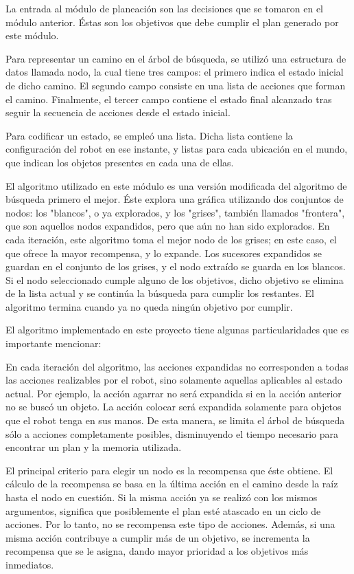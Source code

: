 \documentclass[11pt]{article}
\begin{document}
La entrada al módulo de planeación son las decisiones que se tomaron en el módulo anterior. Éstas son los objetivos que debe cumplir el plan generado por este módulo.

Para representar un camino en el árbol de búsqueda, se utilizó una estructura de datos llamada nodo, la cual tiene tres campos: el primero indica el estado inicial de dicho camino. El segundo campo consiste en una lista de acciones que forman el camino. Finalmente, el tercer campo contiene el estado final alcanzado tras seguir la secuencia de acciones desde el estado inicial.

Para codificar un estado, se empleó una lista. Dicha lista contiene la configuración del robot en ese instante, y listas para cada ubicación en el mundo, que indican los objetos presentes en cada una de ellas.

El algoritmo utilizado en este módulo es una versión modificada del algoritmo de búsqueda primero el mejor. Éste explora una gráfica utilizando dos conjuntos de nodos: los "blancos", o ya explorados, y los "grises", también llamados "frontera", que son aquellos nodos expandidos, pero que aún no han sido explorados. En cada iteración, este algoritmo toma el mejor nodo de los grises; en este caso, el que ofrece la mayor recompensa, y lo expande. Los sucesores expandidos se guardan en el conjunto de los grises, y el nodo extraído se guarda en los blancos. Si el nodo seleccionado cumple alguno de los objetivos, dicho objetivo se elimina de la lista actual y se continúa la búsqueda para cumplir los restantes. El algoritmo termina cuando ya no queda ningún objetivo por cumplir.

El algoritmo implementado en este proyecto tiene algunas particularidades que es importante mencionar:

En cada iteración del algoritmo, las acciones expandidas no corresponden a todas las acciones realizables por el robot, sino solamente aquellas aplicables al estado actual. Por ejemplo, la acción agarrar no será expandida si en la acción anterior no se buscó un objeto. La acción colocar será expandida solamente para objetos que el robot tenga en sus manos. De esta manera, se limita el árbol de búsqueda sólo a acciones completamente posibles, disminuyendo el tiempo necesario para encontrar un plan y la memoria utilizada.

El principal criterio para elegir un nodo es la recompensa que éste obtiene. El cálculo de la recompensa se basa en la última acción en el camino desde la raíz hasta el nodo en cuestión. Si la misma acción ya se realizó con los mismos argumentos, significa que posiblemente el plan esté atascado en un ciclo de acciones. Por lo tanto, no se recompensa este tipo de acciones. Además, si una misma acción contribuye a cumplir más de un objetivo, se incrementa la recompensa que se le asigna, dando mayor prioridad a los objetivos más inmediatos.
\end{document}
